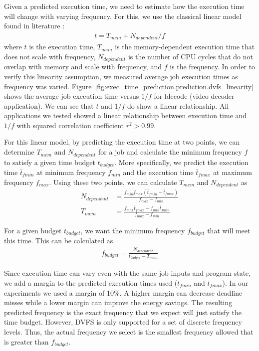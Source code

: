Given a predicted execution time, we need to estimate how the execution time
will change with varying frequency. For this, we use the classical linear model
found in literature \cite{xie-pldi03, wu-micro05}:
\begin{align*}
  t = T_{mem} + N_{dependent}/f
\end{align*}
where $t$ is the execution time, $T_{mem}$ is the memory-dependent execution
time that does not scale with frequency, $N_{dependent}$ is the number of CPU
cycles that do not overlap with memory and scale with frequency, and $f$ is the
frequency.  In order to verify this linearity assumption, we measured average
job execution times as frequency was varied.
Figure~\ref{fig:exec_time_prediction.prediction.dvfs_linearity} shows the
average job execution time versus $1/f$ for ldecode (video decoder
application). We can see that $t$ and $1/f$ do show a linear relationship. 
All applications we tested showed a linear relationship between execution time
and $1/f$ with squared correlation coefficient $r^2 > 0.99$.

For this linear model, by predicting the execution time at two points, we can
determine $T_{mem}$ and $N_{dependent}$ for a job and calculate the minimum
frequency $f$ to satisfy a given time budget $t_{budget}$. More specifically,
we predict the execution time $\bar{t}_{fmin}$ at minimum frequency $f_{min}$
and the execution time $\bar{t}_{fmax}$ at maximum frequency $f_{max}$. Using
these two points, we can calculate $T_{mem}$ and $N_{dependent}$ as
\begin{align*}
  N_{dependent} &= \frac{f_{min}f_{max}(\bar{t}_{fmin} - \bar{t}_{fmax})}{f_{max} - f_{min}} \\
  T_{mem} &= \frac{f_{max}\bar{t}_{fmax} - f_{min}\bar{t}_{fmin}}{f_{max} - f_{min}}
\end{align*}

For a given budget $t_{budget}$, we want the minimum frequency $f_{budget}$
that will meet this time. This can be calculated as
\begin{align*}
  f_{budget} = \frac{N_{dependent}}{t_{budget} - T_{mem}}
\end{align*}

Since execution time can vary even with the same job inputs and program state,
we add a margin to the predicted execution times used ($t_{fmin}$ and
$t_{fmax}$). In our experiments we used a margin of 10\%. A higher margin can
decrease deadline misses while a lower margin can improve the energy savings.
The resulting predicted frequency is the exact frequency that we expect will
just satisfy the time budget. However, DVFS is only supported for a set of
discrete frequency levels. Thus, the actual frequency we select is the smallest
frequency allowed that is greater than $f_{budget}$. 


